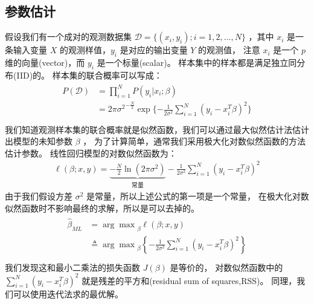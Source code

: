 \documentclass[letterpaper,10pt,english]{sphinxmanual}
\begin{document}
\subsection{参数估计}
\label{\detokenize{_u7ebf_u6027_u56de_u5f52/content:id7}}
假设我们有一个成对的观测数据集 \(\mathcal{D}=\{(x_i,y_i);i=1,2,\dots,N\}\)
，其中 \(x_i\) 是一条输入变量 \(X\) 的观测样值，\(y_i\) 是对应的输出变量 \(Y\) 的观测值，
注意 \(x_i\) 是一个 \(p\) 维的向量(vector)，而 \(y_i\) 是一个标量(scalar)。
样本集中的样本都是满足独立同分布(IID)的。
样本集的联合概率可以写成：
\begin{align}\label{equation:线性回归/content:线性回归/content:10}\!\begin{aligned}
P(\mathcal{D}) &= \prod_{i=1}^N P(y_i|x_i;\beta)\\
&=  {2\pi\sigma^2}^{-\frac{N}{2}} \exp \{ -\frac{1}{2\sigma^2} \sum_{i=1}^N (y_i-x_i^T \beta)^2 \}\\
\end{aligned}\end{align}
我们知道观测样本集的联合概率就是似然函数，我们可以通过最大似然估计法估计出模型的未知参数 \(\beta\) ，
为了计算简单，通常我们采用极大化对数似然函数的方法估计参数。
线性回归模型的对数似然函数为：
\begin{equation}\label{equation:线性回归/content:线性回归/content:11}
\begin{split}\ell(\beta;x,y) = \underbrace{{-\frac{N}{2}} \ln (2\pi\sigma^2)}_{\text{常量}}
-\frac{1}{2\sigma^2} \sum_{i=1}^N (y_i-x_i^T\beta)^2\end{split}
\end{equation}
由于我们假设方差 \(\sigma^2\) 是常量，所以上述公式的第一项是一个常量，
在极大化对数似然函数时不影响最终的求解，所以是可以去掉的。
\begin{align}\label{equation:线性回归/content:线性回归/content:12}\!\begin{aligned}
\hat{\beta}_{ML} &={\arg \max}_{\beta}  \ell(\beta;x,y)\\
&\triangleq  {\arg \max}_{\beta}
\left \{ -\frac{1}{2\sigma^2} \sum_{i=1}^N (y_i-x_i^T \beta)^2
\right \}\\
\end{aligned}\end{align}
我们发现这和最小二乘法的损失函数 \(J(\beta)\) 是等价的，
对数似然函数中的 \(\sum_{i=1}^N (y_i-x_i^T \beta)^2\) 就是残差的平方和(residual sum of squares,RSS)。
同理，我们可以使用迭代法求的最优解。
\end{document}

